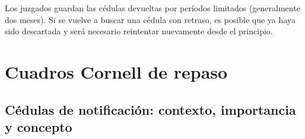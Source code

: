 \documentclass[12pt,oneside]{book}
\begin{document}
\begin{important}
Los juzgados guardan las cédulas devueltas por períodos limitados (generalmente dos meses). Si se vuelve a buscar una cédula con retraso, es posible que ya haya sido descartada y será necesario reintentar nuevamente desde el principio.
\end{important}

\chapter[Cuadros Cornell]{Cuadros Cornell de repaso}

\section{Cédulas de notificación: contexto, importancia y concepto}
\end{document}
